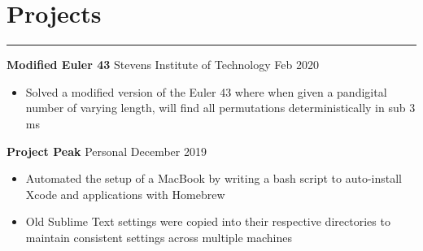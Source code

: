 \documentclass[10pt]{article}
\newcommand{\resumesection}[1]{\vspace{-0.2cm}\section*{#1}\vspace{-0.2cm}\hrule\vspace{0.2cm}}
\begin{document}
%


\resumesection{Projects}

\textbf{Modified Euler 43} Stevens Institute of Technology \hfill Feb 2020\par
\begin{itemize}
	\item Solved a modified version of the Euler 43 where when given a pandigital number of varying length, will find all permutations deterministically in sub 3 ms
\end{itemize}

\textbf{Project Peak} Personal \hfill December 2019\par
\begin{itemize}
	\item Automated the setup of a MacBook by writing a bash script to auto-install Xcode and applications with Homebrew
	\item Old Sublime Text settings were copied into their respective directories to maintain consistent settings across multiple machines
\end{itemize}
\end{document}
